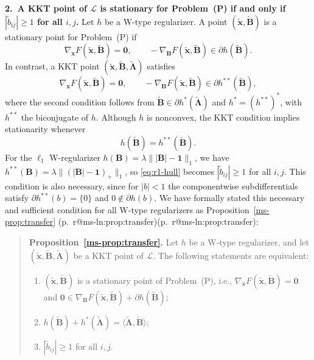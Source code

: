 \documentclass[11pt]{article}
\makeatletter
\newcommand{\mref}[1]{\ref*{ms-#1}}
\newcommand{\mpage}[1]{\pageref*{ms-#1}}
\newcommand{\mhasline}[1]{\ifcsname r@ms-ln:#1\endcsname\expandafter\@firstoftwo\else\expandafter\@secondoftwo\fi}
\newcommand{\mline}[1]{\getrefnumber{ms-ln:#1}}
\newcommand{\mpl}[1]{p.~\mpage{#1}\mhasline{#1}{, line~\mline{#1}}{}}
\newcommand{\zero}{\bm{0}}
\newcommand{\calL}{\mathcal{L}}
\newcommand{\bB}{\bm{B}}
\newcommand{\bLmbd}{\bm{\Lambda}}
\newcommand{\bx}{\bm{x}}
\newcommand{\blue}[1]{{\ifmmode\color{blue}#1\else\normalfont\upshape\color{blue}#1\fi}}
\newenvironment{bluequote}{\begin{quote}\normalfont\upshape\color{blue}}{\end{quote}}
\newcommand{\newred}[1]{{\color{red}#1}}
\let\reviewitem\item
\newenvironment{qalist}{\begin{description}[leftmargin=0pt,labelindent=0pt,itemsep=0.8em,parsep=0.5em,font=\normalfont\upshape\bfseries]}{\end{description}}
\makeatother
\begin{document}
\begin{qalist}
\textbf{2.~A KKT point of $\calL$ is stationary for Problem~(P) if and only if $|\tilde b_{ij}|\ge1$ for all $i,j$.} Let $h$ be a W-type regularizer. A point $(\tilde{\bx},\tilde{\bB})$ is a stationary point for Problem~(P) if
\[
\nabla_{\bx}F(\tilde{\bx},\tilde{\bB})=\zero,
\qquad
-\nabla_{\bB}F(\tilde{\bx},\tilde{\bB})\in\partial h(\tilde{\bB}).
\]
In contrast, a KKT point $(\tilde{\bx},\tilde{\bB},\tilde{\bLmbd})$ satisfies
\[
\nabla_{\bx}F(\tilde{\bx},\tilde{\bB})=\zero,
\qquad
-\nabla_{\bB}F(\tilde{\bx},\tilde{\bB})\in\partial h^{**}(\tilde{\bB}),
\]
where the second condition follows from $\tilde{\bB}\in\partial h^*(\tilde{\bLmbd})$ and $h^*=(h^{**})^*$, with $h^{**}$ the biconjugate of $h$. Although $h$ is nonconvex, \newred{the KKT condition implies stationarity} whenever
\[
h(\tilde{\bB})=h^{**}(\tilde{\bB}).
\tag{R1.1}\label{eq:r1-hull}
\]
For the $\ell_1$ W-regularizer $h(\bB)=\lambda\lVert|\bB|-\mathbf{1}\rVert_1$, we have $h^{**}(\bB)=\lambda\lVert(|\bB|-\mathbf{1})_+\rVert_1$, so \eqref{eq:r1-hull} becomes $|\tilde b_{ij}|\ge1$ for all $i,j$. This condition is also necessary, since for $|b|<1$ the componentwise subdifferentials satisfy $\partial h^{**}(b)=\{0\}$ and $0\notin\partial h(b)$. We have formally stated this necessary and sufficient condition for all W-type regularizers as Proposition~\mref{prop:transfer} \blue{(\mpl{prop:transfer})}:
\begin{bluequote}
\textbf{Proposition~\mref{prop:transfer}.} Let $h$ be a W-type regularizer, and let $(\tilde{\bx},\tilde{\bB},\tilde{\bLmbd})$ be a KKT point of $\calL$. The following statements are equivalent:
\begin{enumerate}[label=\textup{(\alph*)},leftmargin=2em,before=\let\item\reviewitem]
\item $(\tilde{\bx},\tilde{\bB})$ is a stationary point of Problem~(P), i.e., $\nabla_{\bx}F(\tilde{\bx},\tilde{\bB})=\zero$ and $\zero\in\nabla_{\bB}F(\tilde{\bx},\tilde{\bB})+\partial h(\tilde{\bB})$;
\item $h(\tilde{\bB})+h^*(\tilde{\bLmbd})=\langle\tilde{\bLmbd},\tilde{\bB}\rangle$;
\item $|\tilde b_{ij}|\ge1$ for all $i,j$.
\end{enumerate}
\end{bluequote}


\end{qalist}
\end{document}
